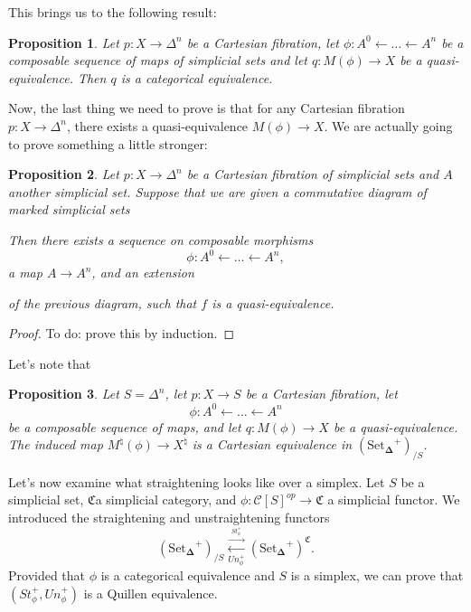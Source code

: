 \documentclass[12pt]{amsart}
\newcommand{\8}{\ensuremath{\infty}}
\newcommand{\C}{\ensuremath{\mathfrak{C}}}
\newcommand{\SSet}{\ensuremath{\text{Set}_{\boldsymbol{\Delta}}}}
\newcommand{\adj}[2]{\ensuremath{\overset{\overset{#1}{ \rightarrow}}{\underset{#2}{\leftarrow}}}}
\newtheorem{proposition}{Proposition}
\begin{document}
This brings us to the following result:
\begin{proposition}
  Let $p:X\rightarrow \Delta^n$ be a Cartesian fibration, let $\phi:A^0\leftarrow\dots\leftarrow A^n$ be a composable sequence of maps of simplicial sets and let $q:M(\phi)\rightarrow X$ be a quasi-equivalence. Then $q$ is a categorical equivalence.
\end{proposition}

Now, the last thing we need to prove is that for any Cartesian fibration $p:X\rightarrow \Delta^n$, there exists a quasi-equivalence $M(\phi)\rightarrow X$. We are actually going to prove something a little stronger:

\begin{proposition}
  Let $p:X\rightarrow \Delta^n$ be a Cartesian fibration of simplicial sets and $A$ another simplicial set. Suppose that we are given a commutative diagram of marked simplicial sets 
  Then there exists a sequence on composable morphisms \[\phi:A^0\leftarrow\dots\leftarrow A^n,\]
  a map $A\rightarrow A^n$, and an extension
  of the previous diagram, such that $f$ is a quasi-equivalence.
\end{proposition}

\begin{proof}
  To do: prove this by induction.
\end{proof}

Let's note that
\begin{proposition}
  Let $S=\Delta^n$, let $p:X\rightarrow S$ be a Cartesian fibration, let \[\phi:A^0\leftarrow\dots\leftarrow A^n\] be a composable sequence of maps, and let $q:M(\phi)\rightarrow X$ be a quasi-equivalence. The induced map $M^\natural(\phi)\rightarrow X^\natural$ is a Cartesian equivalence in $(\SSet^+)_{/S}$.
\end{proposition}

Let's now examine what straightening looks like over a simplex. Let $S$ be a simplicial set, \C a simplicial category, and $\phi:\mathscr{C}[S]^{op}\rightarrow \C$ a simplicial functor. We introduced the straightening and unstraightening functors
\[(\SSet^+)_{/S}\adj{St^+_\phi}{Un^+_\phi} (\SSet^+)^\C.\]
Provided that $\phi$ is a categorical equivalence and $S$ is a simplex, we can prove that $(St^+_\phi, Un^+_\phi)$ is a Quillen equivalence.
\end{document}
